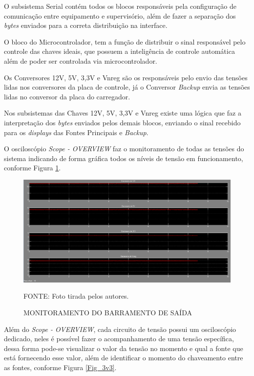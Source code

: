 \documentclass[
	12pt,				%
	openright,			%
	oneside,			%
	a4paper,			%
	english,			%
	french,				%
	spanish,			%
	brazil,				%
	oldfontcommands
	]{abntex2}
\begin{document}
	O subsistema Serial contém todos os blocos responsáveis pela configuração de comunicação entre equipamento e supervisório, além de fazer a separação dos \textit{bytes} enviados para a correta distribuição na interface.
	
	O bloco do Microcontrolador, tem a função de distribuir o sinal responsável pelo controle das chaves ideais, que possuem a inteligência de controle automática além de poder ser controlada via microcontrolador.
	
	Os Conversores 12V, 5V, 3,3V e Vnreg são os responsáveis pelo envio das tensões lidas nos conversores da placa de controle, já o Conversor \textit{Backup} envia as tensões lidas no conversor da placa do carregador.
	
	Nos subsistemas das Chaves 12V, 5V, 3,3V e Vnreg existe uma lógica que faz a interpretação dos \textit{bytes} enviados pelos demais blocos, enviando o sinal recebido para os \textit{displays} das Fontes Principais e \textit{Backup}.
	
	O osciloscópio \textit{Scope - OVERVIEW} faz o monitoramento de todas as tensões do sistema indicando de forma gráfica todos os níveis de tensão em funcionamento, conforme Figura \ref{Fig_over}.
	
	\begin{figure}[th]
		\caption{MONITORAMENTO DO BARRAMENTO DE SAÍDA}
		\label{Fig_over}
		\centering
		\includegraphics[width=1.0\linewidth]{./figs/over}
			
		\begin{small}
			FONTE: Foto tirada pelos autores.
		\end{small}		
	\end{figure}
	\pagebreak
	
	Além do \textit{Scope - OVERVIEW}, cada circuito de tensão possui um osciloscópio dedicado, neles é possível fazer o acompanhamento de uma tensão específica, dessa forma pode-se visualizar o valor da tensão no momento e qual a fonte que está fornecendo esse valor, além de identificar o momento do chaveamento entre as fontes, conforme Figura \ref{Fig_3v3}.
	
\end{document}
